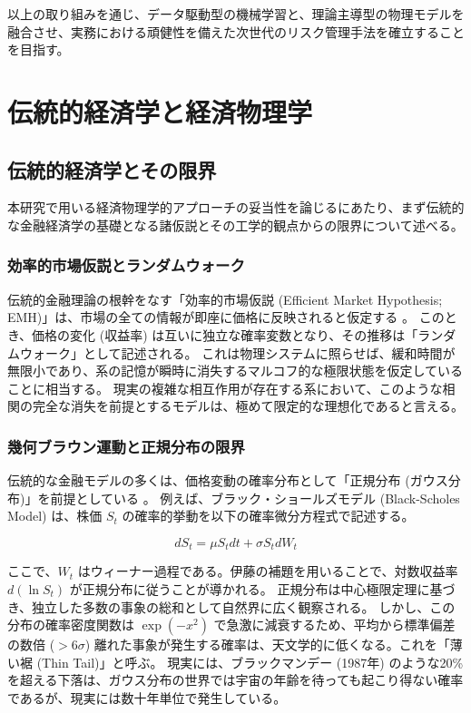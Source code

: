 \documentclass[11pt,a4paper,oneside]{ltjsarticle}
\begin{document}
以上の取り組みを通じ、データ駆動型の機械学習と、理論主導型の物理モデルを融合させ、実務における頑健性を備えた次世代のリスク管理手法を確立することを目指す。

\clearpage
\section{伝統的経済学と経済物理学}
\subsection{伝統的経済学とその限界}
本研究で用いる経済物理学的アプローチの妥当性を論じるにあたり、まず伝統的な金融経済学の基礎となる諸仮説とその工学的観点からの限界について述べる。

\subsubsection{効率的市場仮説とランダムウォーク}
伝統的金融理論の根幹をなす「効率的市場仮説 (Efficient Market Hypothesis; EMH)」は、市場の全ての情報が即座に価格に反映されると仮定する \cite{cite:5}\cite{cite:6}。
このとき、価格の変化 (収益率) は互いに独立な確率変数となり、その推移は「ランダムウォーク」として記述される。
これは物理システムに照らせば、緩和時間が無限小であり、系の記憶が瞬時に消失するマルコフ的な極限状態を仮定していることに相当する。
現実の複雑な相互作用が存在する系において、このような相関の完全な消失を前提とするモデルは、極めて限定的な理想化であると言える。
    
\subsubsection{幾何ブラウン運動と正規分布の限界}
伝統的な金融モデルの多くは、価格変動の確率分布として「正規分布 (ガウス分布)」を前提としている \cite{cite:7}。
例えば、ブラック・ショールズモデル (Black-Scholes Model) は、株価 $S_t$ の確率的挙動を以下の確率微分方程式で記述する。

$$dS_{t}=\mu S_{t}dt+\sigma S_{t}dW_{t}$$

ここで、$W_t$ はウィーナー過程である。伊藤の補題を用いることで、対数収益率 $d(\ln S_t)$ が正規分布に従うことが導かれる。
正規分布は中心極限定理に基づき、独立した多数の事象の総和として自然界に広く観察される。
しかし、この分布の確率密度関数は $\exp(-x^2)$ で急激に減衰するため、平均から標準偏差の数倍 ($>6\sigma$) 離れた事象が発生する確率は、天文学的に低くなる。これを「薄い裾 (Thin Tail)」と呼ぶ。
現実には、ブラックマンデー (1987年) のような20\%を超える下落は、ガウス分布の世界では宇宙の年齢を待っても起こり得ない確率であるが、現実には数十年単位で発生している。
\end{document}
